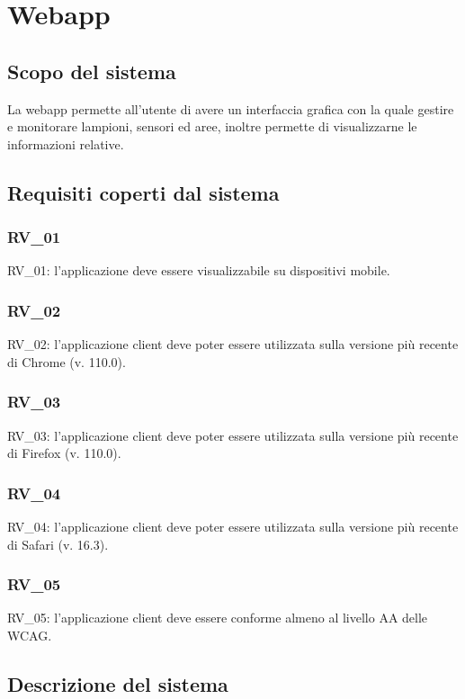 \chapter{Webapp}\label{cap:webapp}

\section{Scopo del sistema}

La webapp permette all'utente di avere un interfaccia grafica con la quale gestire e monitorare lampioni, sensori ed aree, inoltre permette di visualizzarne le informazioni relative.

\section{Requisiti coperti dal sistema}

\subsection{RV\_01}
RV\_01: l'applicazione deve essere visualizzabile su dispositivi mobile.

\subsection{RV\_02}
RV\_02: l'applicazione client deve poter essere utilizzata sulla versione più recente di Chrome (v. 110.0).

\subsection{RV\_03}
RV\_03: l'applicazione client deve poter essere utilizzata sulla versione più recente di Firefox (v. 110.0).

\subsection{RV\_04}
RV\_04: l'applicazione client deve poter essere utilizzata sulla versione più recente di Safari (v. 16.3).

\subsection{RV\_05}
RV\_05: l'applicazione client deve essere conforme almeno al livello AA delle WCAG.


\section{Descrizione del sistema}

